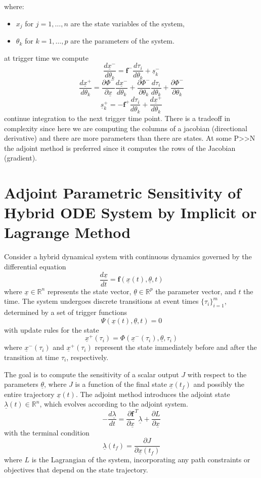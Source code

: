 \documentclass{article}
\begin{document}
where:
\begin{itemize}
    \item \(x_j\) for \(j = 1, \ldots, n\) are the state variables of the system,
    \item \(\theta_k\) for \(k = 1, \ldots, p\) are the parameters of the system.
\end{itemize}

at trigger time we compute
\[
\frac{d \underline{x}^-}{d \theta_k} = \boldsymbol{f}^- \frac{d\tau_i}{d\theta_k} + \underline{s}^-_k
\]
\[
\frac{d \underline{x}^+}{d\theta_k} = \frac{\partial \Phi^-}{\partial \underline{x}}\frac{d \underline{x}^-}{d \theta_k} + \frac{\partial \Phi^-}{\partial\theta_k}\frac{d\tau_i}{d\theta_k}+\frac{\partial \Phi^-}{\partial\theta_k}
\]
\[
\underline{s}^+_k = -\boldsymbol{f}^+\frac{d\tau_i}{d\theta_k} + \frac{d \underline{x}^+}{d\theta_k}
\]
continue integration to the next trigger time point.
There is a tradeoff in complexity since here we are computing the columns of a jacobian (directional derivative) and there are more parameters than there are states. At some P>>N the adjoint method is preferred since it computes the rows of the Jacobian (gradient).
\section{Adjoint Parametric Sensitivity of Hybrid ODE System by Implicit or Lagrange Method }

Consider a hybrid dynamical system with continuous dynamics governed by the differential equation
\[
\frac{d\underline{x}}{dt} = \boldsymbol{f}(\underline{x}(t), \underline{\theta}, t)
\]
where \(\underline{x} \in \mathbb{R}^n\) represents the state vector, \(\underline{\theta} \in \mathbb{R}^p\) the parameter vector, and \(t\) the time. The system undergoes discrete transitions at event times \(\{\tau_i\}_{i=1}^{m}\), determined by a set of trigger functions
\[
\Psi(\underline{x}(t), \underline{\theta}, t) = 0
\]
with update rules for the state
\[
\underline{x}^+(\tau_i) = \Phi(\underline{x}^-(\tau_i), \underline{\theta}, \tau_i)
\]
where \(\underline{x}^-(\tau_i)\) and \(\underline{x}^+(\tau_i)\) represent the state immediately before and after the transition at time \(\tau_i\), respectively.

The goal is to compute the sensitivity of a scalar output \(J\) with respect to the parameters \(\underline{\theta}\), where \(J\) is a function of the final state \(\underline{x}(t_f)\) and possibly the entire trajectory \(\underline{x}(t)\). The adjoint method introduces the adjoint state \(\underline{\lambda}(t) \in \mathbb{R}^n\), which evolves according to the adjoint system. 
\[
-\frac{d\underline{\lambda}}{dt} = \frac{\partial \boldsymbol{f}}{\partial \underline{x}}^T \underline{\lambda} + \frac{\partial L}{\partial \underline{x}}
\]
with the terminal condition
\[
\underline{\lambda}(t_f) = \frac{\partial J}{\partial \underline{x}(t_f)}
\]
where \(L\) is the Lagrangian of the system, incorporating any path constraints or objectives that depend on the state trajectory. 
\end{document}
